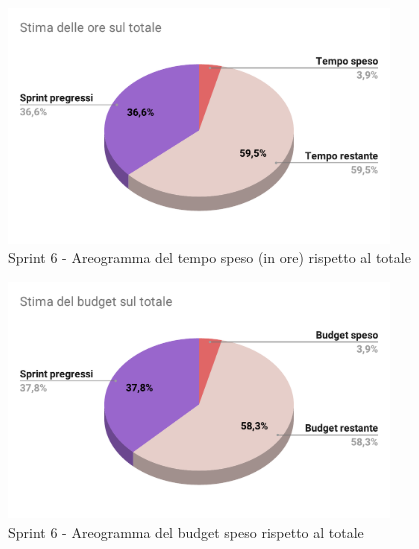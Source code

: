  \begin{figure}[H]
    \centering
    \includegraphics[width=0.90\textwidth]{assets/Consuntivo/Sprint-6/copertura_oraria.pdf}
    \caption{Sprint 6 - Areogramma del tempo speso (in ore) rispetto al totale}
  \end{figure}
  
  \begin{figure}[H]
    \centering
    \includegraphics[width=0.90\textwidth]{assets/Consuntivo/Sprint-6/budget_speso.pdf}
    \caption{Sprint 6 - Areogramma del budget speso rispetto al totale}
  \end{figure}
  
